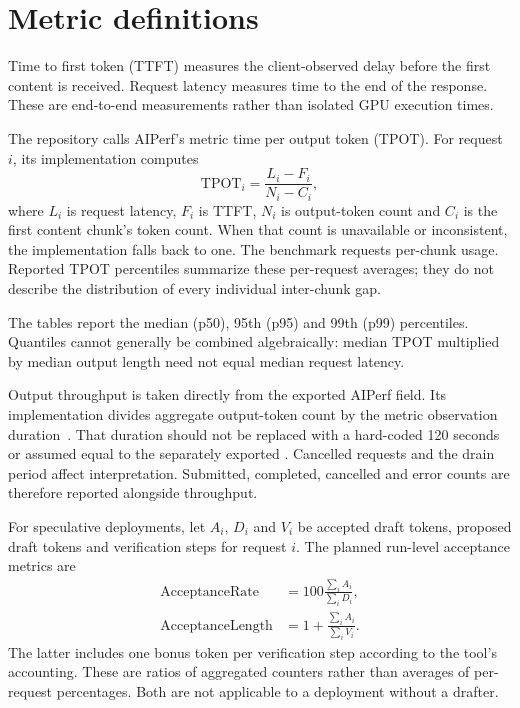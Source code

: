 \section{Metric definitions}
Time to first token (TTFT) measures the client-observed delay before the first content is received. Request latency measures time to the end of the response. These are end-to-end measurements rather than isolated GPU execution times.

The repository calls AIPerf's  metric time per output token (TPOT). For request $i$, its implementation computes~\cite{aiperfitl}
\begin{equation}
\mathrm{TPOT}_i=\frac{L_i-F_i}{N_i-C_i},
\end{equation}
where $L_i$ is request latency, $F_i$ is TTFT, $N_i$ is output-token count and $C_i$ is the first content chunk's token count. When that count is unavailable or inconsistent, the implementation falls back to one. The benchmark requests per-chunk usage. Reported TPOT percentiles summarize these per-request averages; they do not describe the distribution of every individual inter-chunk gap.

The tables report the median (p50), 95th (p95) and 99th (p99) percentiles. Quantiles cannot generally be combined algebraically: median TPOT multiplied by median output length need not equal median request latency.

Output throughput is taken directly from the exported AIPerf  field. Its implementation divides aggregate output-token count by the metric observation duration~\cite{aiperftps}. That duration should not be replaced with a hard-coded 120 seconds or assumed equal to the separately exported . Cancelled requests and the drain period affect interpretation. Submitted, completed, cancelled and error counts are therefore reported alongside throughput.

For speculative deployments, let $A_i$, $D_i$ and $V_i$ be accepted draft tokens, proposed draft tokens and verification steps for request $i$. The planned run-level acceptance metrics are~\cite{aiperfspec}
\begin{align}
\mathrm{AcceptanceRate}&=100\frac{\sum_i A_i}{\sum_i D_i},\\
\mathrm{AcceptanceLength}&=1+\frac{\sum_i A_i}{\sum_i V_i}.
\end{align}
The latter includes one bonus token per verification step according to the tool's accounting. These are ratios of aggregated counters rather than averages of per-request percentages. Both are not applicable to a deployment without a drafter.

